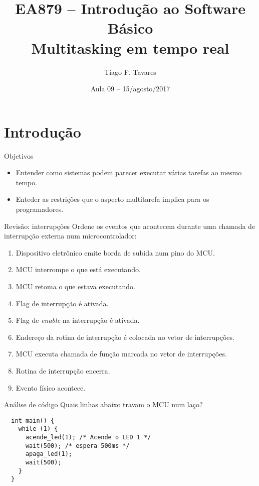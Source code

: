 \documentclass{beamer}
\title[09-multitasking-tempo-real]{EA879 -- Introdução ao Software
Básico\\Multitasking em tempo real}
\author{Tiago F. Tavares}
\institute{FEEC -- UNICAMP}
\date{Aula 09 -- 15/agosto/2017}
\begin{document}
\begin{frame}
  \titlepage
\end{frame}


\section{Introdução}

\begin{frame}{Objetivos}
  \Large
  \begin{itemize}
    \item Entender como
      sistemas podem parecer executar várias tarefas ao mesmo tempo.
    \item Enteder as restrições que o aspecto multitarefa implica para os
      programadores.
  \end{itemize}
\end{frame}


\begin{frame}[fragile]{Revisão: interrupções}
  \centering
  \large
  Ordene os eventos que acontecem durante uma chamada de interrupção externa num
  microcontrolador:
  \begin{enumerate}
    \item Dispositivo eletrônico emite borda de subida num pino do MCU.
    \item MCU interrompe o que está executando.
    \item MCU retoma o que estava executando.
    \item Flag de interrupção é ativada.
    \item Flag de \textit{enable} na interrupção é ativada.
    \item Endereço da rotina de interrupção é colocada no vetor de interrupções.
    \item MCU executa chamada de função marcada no vetor de interrupções.
    \item Rotina de interrupção encerra.
    \item Evento físico acontece.
  \end{enumerate}
\end{frame}

\begin{frame}[fragile]{Análise de código}
  \centering
  \large
  Quais linhas abaixo travam o MCU num laço?
  \begin{verbatim}
  int main() {
    while (1) {
      acende_led(1); /* Acende o LED 1 */
      wait(500); /* espera 500ms */
      apaga_led(1);
      wait(500);
    }
  }
  \end{verbatim}
\end{frame}
\end{document}
